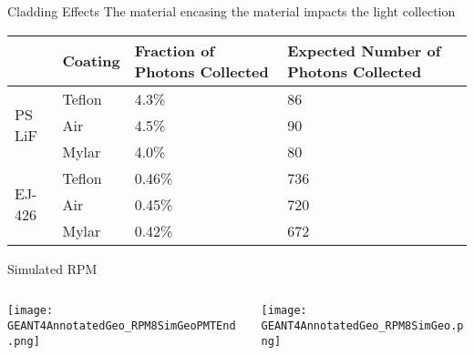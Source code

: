 \begin{frame}{Cladding Effects}
The material encasing the material impacts the light collection
\begin{table}
  \small
  \begin{tabular}{p{1.5cm} m{1.5cm} m{3cm} m{3cm}}
  \toprule
  & Coating & Fraction of Photons Collected & Expected Number of Photons Collected \\
  \midrule 
  \multirow{3}{*}{PS LiF} & Teflon & 4.3\% & 86\\
  				      & Air & 4.5\% & 90\\
				      & Mylar & 4.0\% & 80\\
  \midrule 
  \multirow{3}{*}{EJ-426} & Teflon & 0.46\% &736\\
  				      & Air & 0.45\% & 720\\
				      & Mylar & 0.42\% & 672 \\
 \bottomrule				 	   				  
 \end{tabular}
\end{table}
\end{frame}
\begin{frame}{Simulated RPM}
  \begin{columns}[onlytextwidth]
    \begin{column}{0.45\textwidth}
		\texttt{[image: GEANT4AnnotatedGeo\_RPM8SimGeoPMTEnd.png]}
    \end{column}
    \begin{column}{0.45\textwidth}
		\texttt{[image: GEANT4AnnotatedGeo\_RPM8SimGeo.png]}
    \end{column}
  \end{columns}
\end{frame}
